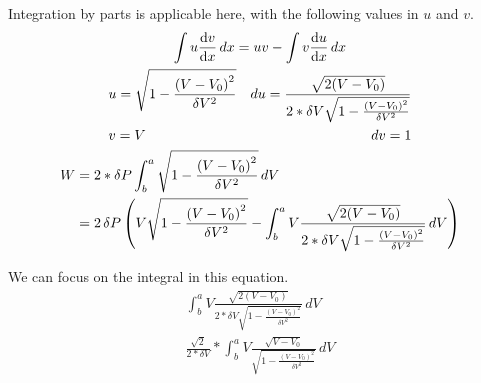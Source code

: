 \documentclass[12pt]{article}
\begin{document}
            Integration by parts is applicable here, with the following values in $u$ and $v$.
            \begin{gather}
                \int u\dv{v}{x}\,dx = uv - \int v\dv{u}{x}\,dx\\
                \begin{align}
                    &u  =   \sqrt{ 1 - \frac{ \left( V - V_0 \right)^2 }{ \delta V^2 } }
                        &du =   \frac{\sqrt{2 (V - V_0) }}{2*\delta V \sqrt{1 - \frac{ \left( V - V_0 \right)^2}{\delta V^2} }}\\
                    &v  =   V   
                        &dv = 1
                \end{align}\\
                \begin{align}
                    W   &=  2 * \delta P \int_{b}^{a} \sqrt{ 1 - \frac{\left( V - V_0 \right)^2}{\delta V^2} }\,dV\\
                        &=  2\,\delta P \left( V \sqrt{ 1 - \frac{ \left( V - V_0 \right)^2 }{ \delta V^2 } } - \int_{b}^{a} V \frac{\sqrt{2 (V - V_0) }}{2*\delta V \sqrt{1 - \frac{ \left( V - V_0 \right)^2}{\delta V^2} }}\,dV \right)
                \end{align}
            \end{gather}

            We can focus on the integral in this equation.
            \begin{gather}
                \int_{b}^{a} V \frac{\sqrt{2 (V - V_0) }}{2*\delta V \sqrt{1 - \frac{ \left( V - V_0 \right)^2}{\delta V^2} }}\,dV\\
                \frac{\sqrt{2}}{2 * \delta V} * \int_{b}^{a} V \frac{\sqrt{ V - V_0 }}{\sqrt{1 - \frac{ \left( V - V_0 \right)^2}{\delta V^2} }}\,dV\\
            \end{gather}
\end{document}

